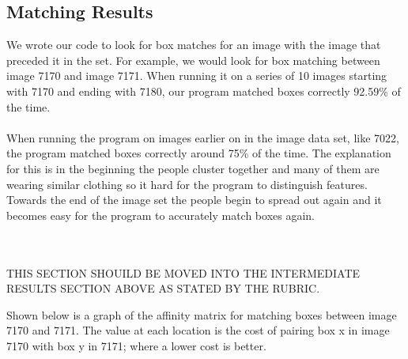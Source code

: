 \documentclass{article}
\begin{document}
\subsection{Matching Results}
We wrote our code to look for box matches for an image with the image that preceded it in the set. For example, we would look for box matching between image 7170 and image 7171. When running it on a series of 10 images starting with 7170 and ending with 7180, our program matched boxes correctly 92.59\% of the time. 
~\\~\\
When running the program on images earlier on in the image data set, like 7022, the program matched boxes correctly around 75\% of the time. The explanation for this is in the beginning the people cluster together and many of them are wearing similar clothing so it hard for the program to distinguish features. Towards the end of the image set the people begin to spread out again and it becomes easy for the program to accurately match boxes again. 
~\\~\\~\\
\begin{LARGE}
	THIS SECTION SHOUILD BE MOVED INTO THE INTERMEDIATE RESULTS SECTION ABOVE AS STATED BY THE RUBRIC.
\end{LARGE}
Shown below is a graph of the affinity matrix for matching boxes between image 7170 and 7171. The value at each location is the cost of pairing box x in image 7170 with box y in 7171; where a lower cost is better.
~\\
\begin{center}
\end{center}
\end{document}
